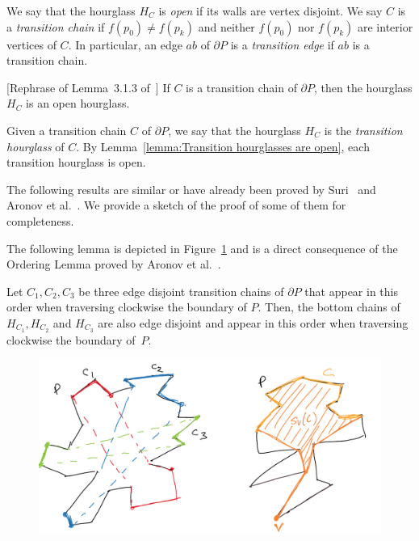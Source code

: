\documentclass[a4paper,UKenglish]{lipics}
\newcommand{\ff}[1]{\ensuremath{f(#1)}}
\begin{document}
We say that the hourglass $H_C$ is \emph{open} if its walls are vertex disjoint. 
We say $C$ is a \emph{transition chain} if $\ff{p_0} \neq \ff{p_k}$ and neither $\ff{p_0}$ nor $\ff{p_k}$ are interior vertices of $C$. 
In particular, an edge $ab$ of $\partial P$ is a \emph{transition edge} if $ab$ is a transition chain.

\begin{lemma}\label{lemma:Transition hourglasses are open}
[Rephrase of Lemma~3.1.3 of~\cite{aronov1993furthest}] 
If $C$ is a transition chain of $\partial P$, then the hourglass $H_C$ is an open hourglass.
\end{lemma}

Given a transition chain $C$ of $\partial P$, we say that the hourglass $H_C$ is the \emph{transition hourglass} of $C$. 
By Lemma~\ref{lemma:Transition hourglasses are open}, each transition hourglass is open.

The following results are similar or have already been proved by Suri~\cite{suri1989computing} and Aronov et al.~\cite{aronov1993furthest}. We provide a sketch of the proof of some of them for completeness.

The following lemma is depicted in Figure~\ref{fig:Order Lemma And Funnels} and is a direct consequence of the Ordering Lemma proved by Aronov et al.~\cite[Corollary 2.7.4]{aronov1993furthest}.
\begin{lemma}\label{lemma:Ordering Lemma}
Let $C_1, C_2, C_3$ be three edge disjoint transition chains of $\partial P$ that appear in this order when traversing clockwise the boundary of $P$. Then, the bottom chains of $H_{C_1}, H_{C_2}$ and $H_{C_3}$ are also edge disjoint and appear in this order when traversing clockwise the boundary of~$P$.
\end{lemma}

\begin{figure}[tb]
\centering
\includegraphics[width=1\textwidth]{img/OrderAndFunnel.pdf}
\caption{\small }
\label{fig:Order Lemma And Funnels}
\end{figure}
\end{document}
